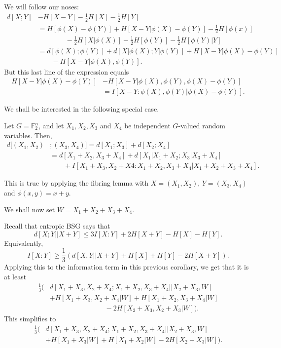 \documentclass[12pt]{article}
\begin{document}
\begin{proofbox}
	We will follow our noses:
	\begin{align*}
		d[X; Y] &- H[X - Y] - \frac 12 H[X] - \frac 12 H[Y] \\
			&= H[\phi(X) - \phi(Y)] + H[X - Y | \phi(X) - \phi(Y)] - \frac 12 H[\phi(x)] \\
			& \qquad \qquad - \frac 12 H[X|\phi(X)] - \frac 12 H[\phi(Y)] - \frac 12 H[\phi(Y)|Y] \\
			&= d[\phi(X); \phi(Y)] + d[X|\phi(X); Y|\phi(Y)] + H[X-Y|\phi(X)-\phi(Y)] \\
			& \qquad - H[X-Y|\phi(X),\phi(Y)].
	\end{align*}
	But this last line of the expression equals
	\begin{align*}
		H[X-Y|\phi(X)-\phi(Y)] &- H[X-Y|\phi(X),\phi(Y),\phi(X) - \phi(Y)] \\
				       &= I[X-Y:\phi(X),\phi(Y)|\phi(X)-\phi(Y)].
	\end{align*}
\end{proofbox}

We shall be interested in the following special case.

\begin{corollary}
	Let $G = \mathbb{F}_2^{n}$, and let $X_1, X_2, X_3$ and $X_4$ be independent $G$-valued random variables. Then,
	\begin{align*}
		d[(X_1, X_2)&; (X_3, X_4)] = d[X_1; X_3] + d[X_2; X_4] \\
					  &= d[X_1 + X_2, X_3 + X_4] + d[X_1|X_1+X_2; X_3|X_3+X_4] \\
					  & \qquad + I[X_1+X_3,X_2+X4:X_1+X_2,X_3+X_4|X_1+X_2+X_3+X_4].
	\end{align*}
\end{corollary}

This is true by applying the fibring lemma with $X = (X_1, X_2)$, $Y = (X_3, X_4)$ and $\phi(x, y) = x + y$.

We shall now set $W = X_1 + X_2 + X_3 + X_4$.

Recall that entropic BSG says that
\[
	d[X; Y || X + Y] \leq 3 I[X : Y] + 2 H[X + Y] - H[X] - H[Y].
\]
Equivalently,
\[
	I[X: Y] \geq \frac 13 \left( d[X, Y || X + Y] + H[X] + H[Y] - 2H[X + Y] \right).
\]
Applying this to the information term in this previous corollary, we get that it is at least
\begin{align*}
	\frac13 \biggl( &d[X_1 + X_3, X_2 + X_4; X_1 + X_2, X_3 + X_4 || X_2 + X_3, W] \\
	&+ H[X_1 + X_3, X_2 + X_4 | W] + H[X_1 + X_2, X_3 + X_4|W] \\
	&\qquad \qquad \qquad \qquad - 2 H[X_2 + X_3, X_2 + X_3|W] \biggr).
\end{align*}
This simplifies to
\begin{align*}
	\frac 13 \biggl(& d[X_1 + X_3, X_2 + X_4; X_1 + X_2, X_3 + X_4||X_2 + X_3, W] \\
		  & + H[X_1 + X_3|W] + H[X_1+X_2|W] - 2H[X_2 + X_3|W] \biggr).
\end{align*}
\end{document}

